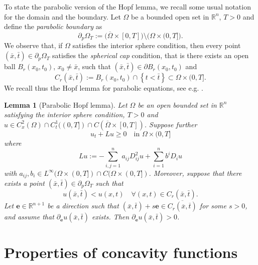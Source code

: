 \documentclass[11pt, reqno]{amsart}
\newtheorem{lemma}{Lemma}[section]
\theoremstyle{definition}
\numberwithin{equation}{section}
\newcommand{\Omegabar}{\overline{\Omega}}
\newcommand{\R}{\mathbb{R}}
\begin{document}
To state the parabolic version of the Hopf lemma, we recall some usual notation for the domain and the boundary. 
Let $\Omega$ be a bounded open set in $\R^n$, $T>0$ and define the \emph{parabolic boundary} as 
\begin{equation}\label{eq_def_parabol_boundary}
\partial_p\Omega_T:=\big(\Omegabar\times[0,T]\big)\setminus\big( \Omega\times(0,T]\big).
\end{equation}
We observe that, if $\Omega$ satisfies the interior sphere condition, then every point $(\bar{x},\bar{t})\in \partial_p \Omega_T$ satisfies the \emph{spherical cap} condition, that is there exists an open ball $B_r(x_0,t_0)$, $x_0\ne \bar{x}$, such that $(\bar{x},\bar{t})\in \partial B_r(x_0, t_0)$ and 
$$C_r(\bar{x},\bar{t}):= B_r(x_0, t_0)\cap \left\{t<\bar{t}\right\}\subset \Omega\times (0,T].$$ 
We recall thus the Hopf lemma for parabolic equations, see e.g. \cite[Theorem 3, page 170]{ProtterWeitenberg1984}.

\begin{lemma}[Parabolic Hopf lemma]
\label{Hopf lemma in parabolic case} 	
Let $\Omega$ be an open bounded set in $\R^n$ satisfying the interior sphere condition, $T>0$ and $u\in C^2_x(\Omega)\cap C^1_t((0,T])\cap C(\Omegabar\times[0,T])$.
	Suppose further
	\[ u_t+Lu\geq 0 \quad \text{in }\Omega\times(0,T]\]
	where \[Lu:=-\sum\limits_{i,j=1}^{n}a_{ij} D^2_{ij}u+\sum\limits_{i=1}^{n}b^iD_{i}u\] 
	with $a_{ij}, b_i \in L^{\infty}(\Omega\times(0,T])\cap C(\Omega\times(0,T])$. 
	Moreover, suppose that there exists a point $(\bar{x},\bar{t})\in \partial_p\Omega_T$ such that
	\[ u(\bar{x},\bar{t})<u(x,t)\quad \forall (x,t)\in C_r(\bar{x},\bar{t}). \]
	Let $\mathbf{e}\in \R^{n+1}$ be a direction such that $(\bar{x},\bar{t})+s\mathbf{e}\in \overline{C_r(\overline{x},\overline{t})}$ for some $s>0$, and assume that $\partial_{\mathbf{e}} u (\bar{x},\bar{t})$ exists. 
	Then $\partial_{\mathbf{e}} u (\bar{x},\bar{t})>0$.
\end{lemma}


\section{Properties of concavity functions}
\label{sec_prop_conc_fun}
\end{document}
